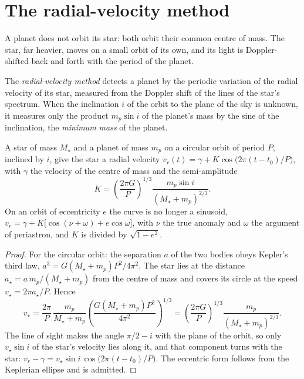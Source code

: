 \section{The radial-velocity method}\label{sec:b3:exoplanets:rv}

A planet does not orbit its star: both orbit their common centre of mass.
The star, far heavier, moves on a small orbit of its own, and its light
is Doppler-shifted back and forth with the period of the planet.

\begin{definition}\label{def:b3:exoplanets:rv}
The \emph{radial-velocity method} detects a
planet by the periodic variation of the radial velocity of its star,
measured from the Doppler shift of the lines of the star's spectrum. When
the inclination $i$ of the orbit to the plane of the sky is unknown, it
measures only the product $m_p\sin i$ of the planet's mass by the sine of
the inclination, the \emph{minimum mass} of the
planet.
\end{definition}

\begin{theorem}\label{thm:b3:exoplanets:semi-amplitude}
A star of mass $M_\star$ and a planet of mass $m_p$ on a circular orbit of
period $P$, inclined by $i$, give the star a radial velocity
$v_r(t) = \gamma + K\cos\bigl(2\pi(t - t_0)/P\bigr)$, with $\gamma$ the
velocity of the centre of mass and the semi-amplitude
\[
K = \left(\frac{2\pi G}{P}\right)^{1/3}
    \frac{m_p\sin i}{(M_\star + m_p)^{2/3}} .
\]
On an orbit of eccentricity $e$ the curve is no longer a sinusoid,
$v_r = \gamma + K\bigl[\cos(\nu + \omega) + e\cos\omega\bigr]$, with $\nu$
the true anomaly and $\omega$ the argument of periastron, and $K$ is
divided by $\sqrt{1 - e^2}$.
\end{theorem}

\begin{proof}
For the circular orbit: the separation $a$ of the two bodies obeys
Kepler's third law, $a^3 = G(M_\star + m_p)P^2/4\pi^2$. The star lies at
the distance $a_\star = a\,m_p/(M_\star + m_p)$ from the centre of mass
and covers its circle at the speed $v_\star = 2\pi a_\star/P$. Hence
\[
v_\star = \frac{2\pi}{P}\,\frac{m_p}{M_\star + m_p}
          \left(\frac{G(M_\star + m_p)P^2}{4\pi^2}\right)^{1/3}
        = \left(\frac{2\pi G}{P}\right)^{1/3}\frac{m_p}{(M_\star + m_p)^{2/3}} .
\]
The line of sight makes the angle $\pi/2 - i$ with the plane of the
orbit, so only $v_\star\sin i$ of the star's velocity lies along it, and
that component turns with the star: $v_r - \gamma = v_\star\sin i\,
\cos\bigl(2\pi(t - t_0)/P\bigr)$. The eccentric form follows from the
Keplerian ellipse and is admitted.
\end{proof}

